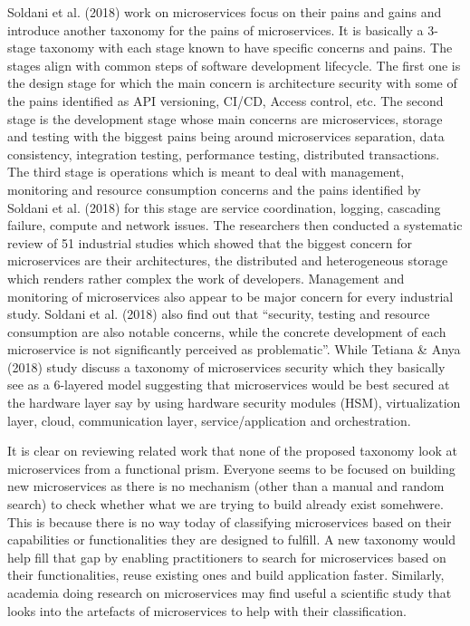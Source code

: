 \documentclass{article}
\begin{document}
Soldani et al. (2018) work on microservices focus on their pains and gains and introduce another taxonomy for the pains of microservices. It is basically a 3-stage taxonomy with each stage known to have specific concerns and pains. The stages align with common steps of software development lifecycle. The first one is the design stage for which the main concern is architecture security with some of the pains identified as API versioning, CI/CD, Access control, etc. The second stage is the development stage whose main concerns are microservices, storage and testing with the biggest pains being around microservices separation, data consistency, integration testing, performance testing, distributed transactions. The third stage is operations which is meant to deal with management, monitoring and resource consumption concerns and the pains identified by Soldani et al. (2018) for this stage are service coordination, logging, cascading failure, compute and network issues. The researchers then conducted a systematic review of 51 industrial studies which showed that the biggest concern for microservices are their architectures, the distributed and heterogeneous storage which renders rather complex the work of developers. Management and monitoring of microservices also appear to be major concern for every industrial study. Soldani et al. (2018) also find out that “security, testing and resource consumption are also notable concerns, while the concrete development of each microservice is not significantly perceived as problematic”. While Tetiana \& Anya (2018) study discuss a taxonomy of microservices security which they basically see as a 6-layered model suggesting that microservices would be best secured at the hardware layer say by using hardware security modules (HSM), virtualization layer, cloud, communication layer, service/application and orchestration. 

It is clear on reviewing related work that none of the proposed taxonomy look at microservices from a functional prism. Everyone seems to be focused on building new microservices as there is no mechanism (other than a manual and random search) to check whether what we are trying to build already exist somehwere. This is because there is no way today of classifying microservices based on their capabilities or functionalities they are designed to fulfill. A new taxonomy would help fill that gap by enabling practitioners to search for microservices based on their functionalities, reuse existing ones and build application faster. Similarly, academia doing research on microservices may find useful a scientific study that looks into the artefacts of microservices to help with their classification.
\end{document}
